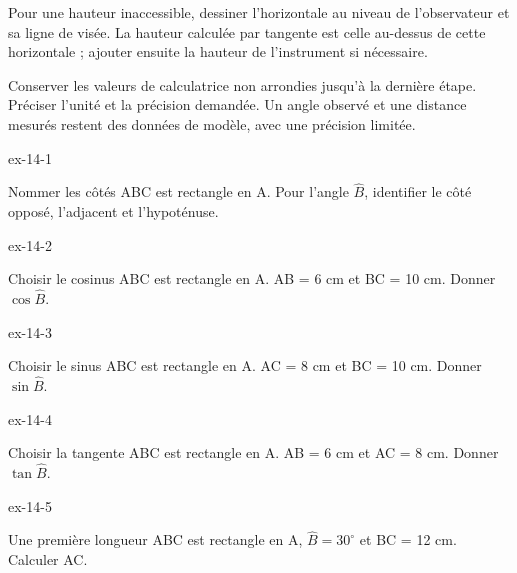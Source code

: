 \begin{savoirfaire}Pour une hauteur inaccessible, dessiner l’horizontale au niveau de l’observateur et sa ligne de visée. La hauteur calculée par tangente est celle au-dessus de cette horizontale ; ajouter ensuite la hauteur de l’instrument si nécessaire.\end{savoirfaire}
\begin{attention}Conserver les valeurs de calculatrice non arrondies jusqu’à la dernière étape. Préciser l’unité et la précision demandée. Un angle observé et une distance mesurés restent des données de modèle, avec une précision limitée.\end{attention}
\clearpage{}
\begin{blocLivre}{ex-14-1}\begin{exercice}[1]{Nommer les côtés}
ABC est rectangle en A. Pour l’angle $\widehat B$, identifier le côté opposé, l’adjacent et l’hypoténuse.
\label{fig-ex-14-1}
\end{exercice}\end{blocLivre}
\begin{blocLivre}{ex-14-2}\begin{exercice}[1]{Choisir le cosinus}
ABC est rectangle en A. AB = 6 cm et BC = 10 cm. Donner $\cos\widehat B$.
\label{fig-ex-14-2}
\end{exercice}\end{blocLivre}
\begin{blocLivre}{ex-14-3}\begin{exercice}[1]{Choisir le sinus}
ABC est rectangle en A. AC = 8 cm et BC = 10 cm. Donner $\sin\widehat B$.
\label{fig-ex-14-3}
\end{exercice}\end{blocLivre}
\begin{blocLivre}{ex-14-4}\begin{exercice}[1]{Choisir la tangente}
ABC est rectangle en A. AB = 6 cm et AC = 8 cm. Donner $\tan\widehat B$.
\label{fig-ex-14-4}
\end{exercice}\end{blocLivre}
\begin{blocLivre}{ex-14-5}\begin{exercice}[1]{Une première longueur}
ABC est rectangle en A, $\widehat B=30^\circ$ et BC = 12 cm. Calculer AC.
\label{fig-ex-14-5}
\end{exercice}\end{blocLivre}

